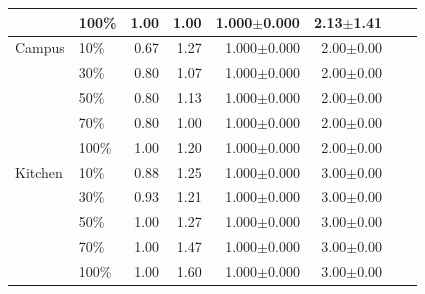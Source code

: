\begin{table}[t]
\begin{tabular}{llrrrrrr}
 & 100\% & 1.00 & 1.00 & 1.000$\pm$0.000 & 2.13$\pm$1.41 \\
\midrule
Campus & 10\% & 0.67 & 1.27 & 1.000$\pm$0.000 & 2.00$\pm$0.00 \\
 & 30\% & 0.80 & 1.07 & 1.000$\pm$0.000 & 2.00$\pm$0.00 \\
 & 50\% & 0.80 & 1.13 & 1.000$\pm$0.000 & 2.00$\pm$0.00 \\
 & 70\% & 0.80 & 1.00 & 1.000$\pm$0.000 & 2.00$\pm$0.00 \\
 & 100\% & 1.00 & 1.20 & 1.000$\pm$0.000 & 2.00$\pm$0.00 \\
\midrule
Kitchen & 10\% & 0.88 & 1.25 & 1.000$\pm$0.000 & 3.00$\pm$0.00 \\
 & 30\% & 0.93 & 1.21 & 1.000$\pm$0.000 & 3.00$\pm$0.00 \\
 & 50\% & 1.00 & 1.27 & 1.000$\pm$0.000 & 3.00$\pm$0.00 \\
 & 70\% & 1.00 & 1.47 & 1.000$\pm$0.000 & 3.00$\pm$0.00 \\
 & 100\% & 1.00 & 1.60 & 1.000$\pm$0.000 & 3.00$\pm$0.00 \\
\midrule
\bottomrule
\end{tabular}
\end{table}